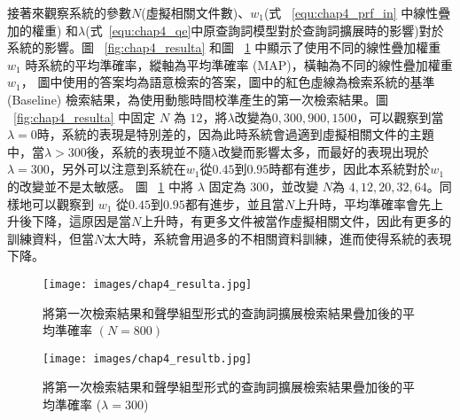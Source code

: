 \begin{table}[htbp]
  \centering
    \caption{系統找回與查詢詞語意相關的文件數量，包括含查詢詞與不含查詢詞的文件數。}
    \label{table:chap4_result2}%
\end{table}%

接著來觀察系統的參數$N$(虛擬相關文件數)、$w_1$(式 ~\ref{equ:chap4_prf_in} 中線性疊加的權重) 和$\lambda$(式~\ref{equ:chap4_qe}中原查詢詞模型對於查詢詞擴展時的影響)對於系統的影響。圖 ~\ref{fig:chap4_resulta} 和圖 ~\ref{fig:chap4_resultb} 中顯示了使用不同的線性疊加權重 $w_1$ 時系統的平均準確率，縱軸為平均準確率 (MAP)，橫軸為不同的線性疊加權重 $w_1$， 圖中使用的答案均為語意檢索的答案，圖中的紅色虛線為檢索系統的基準 (Baseline) 檢索結果，為使用動態時間校準產生的第一次檢索結果。圖 ~\ref{fig:chap4_resulta} 中固定 $N$ 為 $12$，將$\lambda$改變為$0,
300, 900, 1500$，可以觀察到當$\lambda = 0$時，系統的表現是特別差的，因為此時系統會過適到虛擬相關文件的主題中，當$\lambda>300$後，系統的表現並不隨$\lambda$改變而影響太多，而最好的表現出現於$\lambda=300$，另外可以注意到系統在$w_1$從$0.45$到$0.95$時都有進步，因此本系統對於$w_1$的改變並不是太敏感。
圖 ~\ref{fig:chap4_resultb} 中將 $\lambda$ 固定為 $300$，並改變 $N$為 $4, 12, 20, 32, 64$。同樣地可以觀察到 $w_1$ 從$0.45$到$0.95$都有進步，並且當$N$上升時，平均準確率會先上升後下降，這原因是當$N$上升時，有更多文件被當作虛擬相關文件，因此有更多的訓練資料，但當$N$太大時，系統會用過多的不相關資料訓練，進而使得系統的表現下降。

\begin{figure}
\centering
\texttt{[image: images/chap4\_resulta.jpg]}
\caption{將第一次檢索結果和聲學組型形式的查詢詞擴展檢索結果疊加後的平均準確率 $(N = 800)$} \label{fig:chap4_resulta}
\centering
\texttt{[image: images/chap4\_resultb.jpg]}
\caption{將第一次檢索結果和聲學組型形式的查詢詞擴展檢索結果疊加後的平均準確率 ($\lambda = 300$)} \label{fig:chap4_resultb}
\end{figure}


